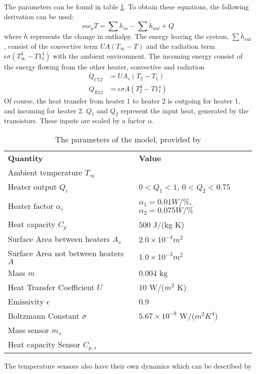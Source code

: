 The parameters can be found in table \ref{tab:theModelPara}. To obtain these equations, the following derivation can be used:
$$
    mc_p\dot{T} = \sum\dot{h}_{in} - \sum\dot{h}_{out} + Q
$$
where $\dot{h}$ represents the change in enthalpy. The energy leaving the system, $ \sum\dot{h}_{out}$, consist of the convective term  $U A (T_{\infty} - T)$ and the radiation term $\epsilon\sigma(T^4_{\infty} - T1^4_1)$ with the ambient environment. The incoming energy consist of the energy flowing from the other heater, convective and radiation
\begin{align}
    Q_{C12} &= U A_s (T_2 -T_1) \nonumber \\
    Q_{R12} &= \epsilon\sigma A (T^4_{2} - T1^4_1) \nonumber
\end{align}
Of course, the heat transfer from heater 1 to heater 2 is outgoing for heater 1, and incoming for heater 2. $Q_1$ and $Q_2$ represent the input heat, generated by the transistors. These inputs are scaled by a factor $\alpha$.
\begin{table}[ht]
    \centering
    \begin{tabular}{l|l}
    \textbf{Quantity} & \textbf{Value} \\
    Ambient temperature $T_{\infty}$    & \\
    Heater output $Q_i$ & $0<Q_1<1$, $0<Q_2<0.75$\\
    Heater factor $\alpha_i$ & $\alpha_1 = 0.01W/\%$, $\alpha_2 = 0.075W/\%$ \\
    Heat capacity $C_p$ & 500 J/(kg K)\\
    Surface Area between heaters $A_s$ & $2.0\times10^{-4} m^2$\\
    Surface Area not between heaters $A$ & $1.0\times10^{-3} m^2$\\
    Mass $m$ & 0.004 kg\\
    Heat Transfer Coefficient $U$ & $10$ W/($m^2$ K) \\
    Emissivity $\epsilon$ & 0.9\\
    Boltzmann Constant $\sigma$ & $5.67\times10^{-8}$ W/($m^2 K^4$) \\
    Mass sensor $m_s$ & \\
    Heat capacity Sensor $C_{p,s}$ & \\
    \end{tabular}
    \caption{The parameters of the model, provided by \cite{APMonitor}}
    \label{tab:theModelPara}
\end{table}
The temperature sensors also have their own dynamics which can be described by
